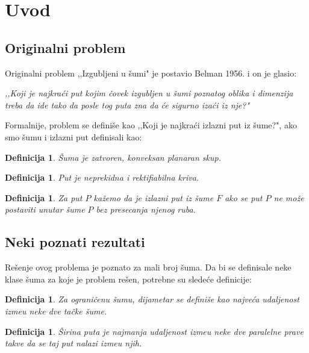 \documentclass[11pt]{article}
\newtheorem{df}[teo]{\bf Definicija}
\begin{document}
\section[Uvod]{Uvod}
\bigskip
\subsection[Originalni problem]{Originalni problem}
\bigskip
Originalni problem ,,Izgubljeni u \v sumi" je postavio Belman 1956.  \cite{Bellman} i on je glasio:
\begin{center}
\textit{,,Koji je najkra\' ci put kojim \v covek izgubljen u \v sumi poznatog oblika i dimenzija treba da ide tako da posle tog puta zna da \' ce sigurno iza\' ci iz nje?"}
\end{center}

\indent Formalnije, problem se defini\v se kao ,,Koji je najkra\' ci izlazni put iz \v sume?", ako smo \v sumu i izlazni put definisali kao:
\begin{df} \v Suma je zatvoren, konveksan planaran skup. \end{df}
\begin{df} Put je neprekidna i rektifiabilna kriva.\end{df}
\begin{df} Za put $P$ ka\v zemo da je izlazni put iz \v sume $F$ ako se put $P$ ne mo\v ze postaviti unutar \v sume $P$ bez presecanja njenog ruba.  \end{df}
\subsection[Neki poznati rezultati]{Neki poznati rezultati}
\bigskip
Re\v senje ovog problema je poznato za mali broj \v suma. Da bi se definisale neke klase \v suma za koje je problem re\v sen, potrebne su slede\' ce definicije:
\begin{df} Za ograni\v cenu \v sumu, dijametar se defini\v se kao najve\' ca udaljenost izme\dj u neke dve ta\v cke \v sume.\end{df}
\begin{df} \v Sirina puta je najmanja udaljenost izme\dj u neke dve paralelne prave takve da se taj put nalazi izme\dj u njih. \end{df}
\end{document}
